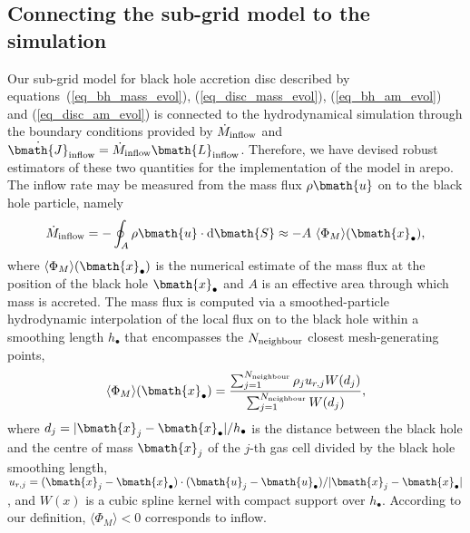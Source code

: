 \documentclass[a4paper,fleqn,usenatbib]{mnras}
\begin{document}

\subsection{Connecting the sub-grid model to the simulation}\label{subsec_inflow}

Our sub-grid model for black hole accretion disc described by equations~(\ref{eq_bh_mass_evol}), (\ref{eq_disc_mass_evol}), (\ref{eq_bh_am_evol}) and (\ref{eq_disc_am_evol}) is connected to the hydrodynamical simulation through the boundary conditions provided by $\dot{M}_{\rm inflow}$ and $\dot{\bmath{J}}_{\rm inflow} = \dot{M}_{\rm inflow} \bmath{L}_{\rm inflow}$.
Therefore, we have devised robust estimators of these two quantities for the implementation of the model in {\sc arepo}.
The inflow rate may be measured from the mass flux $\rho \bmath{u}$ on to the black hole particle, namely 
\begin{equation}
\dot{M}_{\rm inflow} = - \oint_{A} \rho \bmath{u} \cdot {\rm d} \bmath{S} \approx -A~\langle \Phi_{M} \rangle(\bmath{x}_{\bullet}),
\end{equation}
where $\langle \Phi_{M} \rangle(\bmath{x}_{\bullet})$ is the numerical estimate of the mass flux at the position of the black hole $\bmath{x}_{\bullet}$ and $A$ is an effective area through which mass is accreted.
The mass flux is computed via a smoothed-particle hydrodynamic interpolation of the local flux on to the black hole within a smoothing length $h_{\bullet}$ that encompasses the $N_{\rm neighbour}$ closest mesh-generating points, 
\begin{equation} \label{eq_mass_flux_sph}
\langle \Phi_{M} \rangle(\bmath{x}_{\bullet}) = \frac{\sum_{j=1}^{N_{\rm neighbour}} \rho_{j} u_{r, j} W(d_j)}{\sum_{j=1}^{N_{\rm neighbour}} W(d_j)},
\end{equation}
where $d_j = |\bmath{x}_{j} - \bmath{x}_{\bullet}|/h_{\bullet}$ is the distance between the black hole and the centre of mass $\bmath{x}_j$ of the $j$-th gas cell divided by the black hole smoothing length, $u_{r,j} = (\bmath{x}_j - \bmath{x}_{\bullet}) \cdot (\bmath{u}_{j} - \bmath{u}_{\bullet}) / |\bmath{x}_j - \bmath{x}_{\bullet}|$, and $W(x)$ is a cubic spline kernel with compact support over $h_{\bullet}$.
According to our definition, $\langle \Phi_{M} \rangle < 0$ corresponds to inflow.
\end{document}
